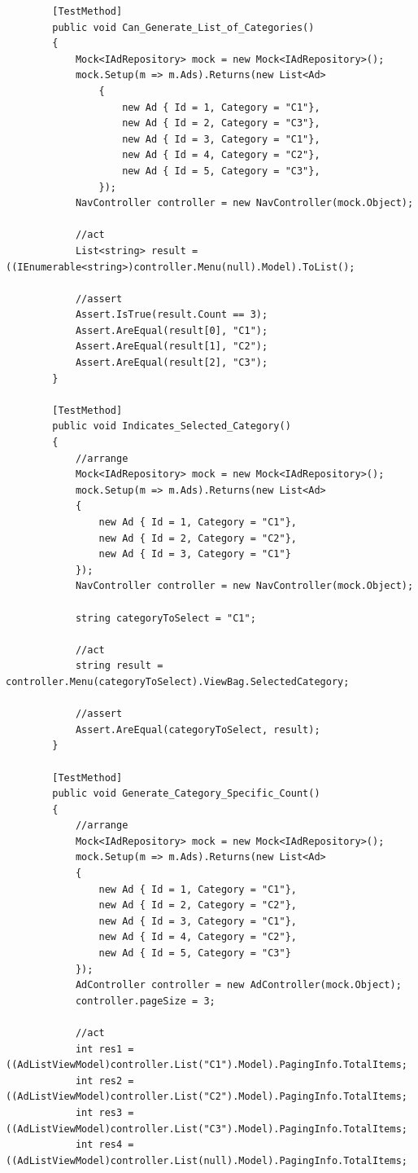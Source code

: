 \documentclass[14pt,a4paper]{extreport}
\begin{document}
\begin{lstlisting}
        [TestMethod]
        public void Can_Generate_List_of_Categories()
        {
            Mock<IAdRepository> mock = new Mock<IAdRepository>();
            mock.Setup(m => m.Ads).Returns(new List<Ad>
                {
                    new Ad { Id = 1, Category = "C1"},
                    new Ad { Id = 2, Category = "C3"},
                    new Ad { Id = 3, Category = "C1"},
                    new Ad { Id = 4, Category = "C2"},
                    new Ad { Id = 5, Category = "C3"},
                });
            NavController controller = new NavController(mock.Object);

            //act
            List<string> result = ((IEnumerable<string>)controller.Menu(null).Model).ToList();

            //assert
            Assert.IsTrue(result.Count == 3);
            Assert.AreEqual(result[0], "C1");
            Assert.AreEqual(result[1], "C2");
            Assert.AreEqual(result[2], "C3");
        }

        [TestMethod]
        public void Indicates_Selected_Category()
        {
            //arrange 
            Mock<IAdRepository> mock = new Mock<IAdRepository>();
            mock.Setup(m => m.Ads).Returns(new List<Ad>
            {
                new Ad { Id = 1, Category = "C1"},
                new Ad { Id = 2, Category = "C2"},
                new Ad { Id = 3, Category = "C1"}
            });
            NavController controller = new NavController(mock.Object);

            string categoryToSelect = "C1";

            //act
            string result = controller.Menu(categoryToSelect).ViewBag.SelectedCategory;

            //assert
            Assert.AreEqual(categoryToSelect, result);
        }

        [TestMethod]
        public void Generate_Category_Specific_Count()
        {
            //arrange 
            Mock<IAdRepository> mock = new Mock<IAdRepository>();
            mock.Setup(m => m.Ads).Returns(new List<Ad>
            {
                new Ad { Id = 1, Category = "C1"},
                new Ad { Id = 2, Category = "C2"},
                new Ad { Id = 3, Category = "C1"},
                new Ad { Id = 4, Category = "C2"},
                new Ad { Id = 5, Category = "C3"}
            });
            AdController controller = new AdController(mock.Object);
            controller.pageSize = 3;

            //act
            int res1 = ((AdListViewModel)controller.List("C1").Model).PagingInfo.TotalItems;
            int res2 = ((AdListViewModel)controller.List("C2").Model).PagingInfo.TotalItems;
            int res3 = ((AdListViewModel)controller.List("C3").Model).PagingInfo.TotalItems;
            int res4 = ((AdListViewModel)controller.List(null).Model).PagingInfo.TotalItems;


\end{lstlisting}
\end{document}
